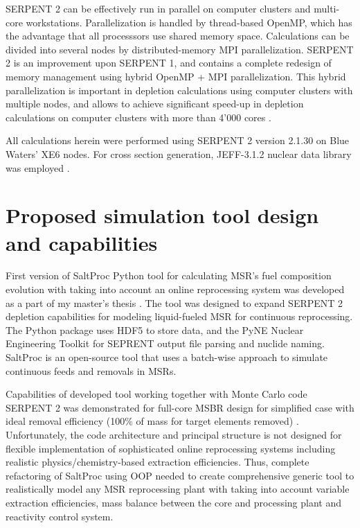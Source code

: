 SERPENT 2 can be effectively run in parallel on computer clusters and multi-core workstations. Parallelization is handled by thread-based OpenMP, which has the advantage that all processsors use shared memory space. Calculations can be divided into several nodes by distributed-memory \gls{MPI} parallelization. SERPENT 2  is an improvement upon SERPENT 1, and contains a complete redesign of memory management using hybrid OpenMP \cite{dagum_openmp_1998} + \gls{MPI} parallelization.  This hybrid parallelization is important in depletion calculations using computer clusters with multiple nodes, and allows to achieve significant speed-up in depletion calculations on computer clusters with more than 4'000 cores \cite{leppanen_serpent_2015}. 

All calculations herein were performed using SERPENT 2 version 2.1.30 on Blue Waters’ XE6 nodes. For cross section generation, JEFF-3.1.2 nuclear data library was employed \cite{oecd/nea_data_bank_jeff-3.1.2_2014}. 

\section{Proposed simulation tool design and capabilities} \label{sec:tool_design}
First version of SaltProc Python tool for calculating \gls{MSR}'s fuel 
composition evolution with taking into account an online reprocessing system 
was developed as a part of my master's thesis \cite{rykhlevskii_advanced_2018, rykhlevskii_arfc/saltproc_2018}. The tool was designed to 
expand SERPENT 2 depletion capabilities for modeling liquid-fueled \gls{MSR} 
for continuous reprocessing. The Python package uses HDF5 
\cite{the_hdf_group_hierarchical_1997} to store 
data, and the PyNE Nuclear Engineering Toolkit \cite{scopatz_pyne_2012}
for SEPRENT output file parsing and nuclide naming. SaltProc is an open-source tool 
that uses a batch-wise approach to simulate continuous feeds and removals in 
\glspl{MSR}. 

Capabilities of developed tool 
working together with Monte Carlo code SERPENT 2 was demonstrated for full-core 
\gls{MSBR} design for simplified case with ideal removal efficiency (100\% of 
mass for target elements removed) \cite{rykhlevskii_modeling_2019}. Unfortunately, 
the code architecture and principal structure is not designed for flexible 
implementation of sophisticated online reprocessing systems including realistic 
physics/chemistry-based extraction efficiencies. Thus, complete refactoring of 
SaltProc using \gls{OOP} needed to create comprehensive 
generic tool to realistically model any \gls{MSR} reprocessing plant with 
taking into account variable extraction efficiencies, mass balance between 
the core and processing plant and reactivity control system.

